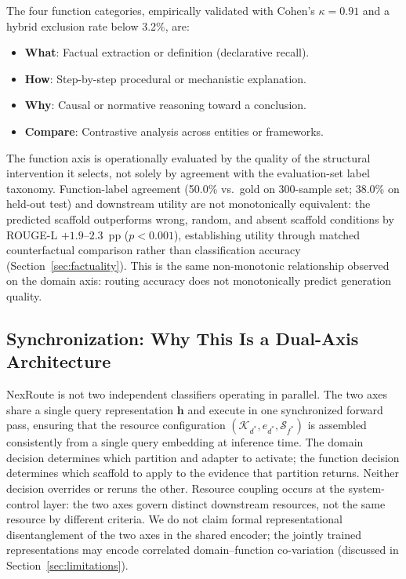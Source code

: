 \documentclass[a4paper,fleql,doubleblind]{cas-sc}
\begin{document}
The four function categories, empirically validated with Cohen's $\kappa = 0.91$ and a hybrid exclusion rate below 3.2\%, are:

\begin{itemize}
    \item \textbf{What}: Factual extraction or definition (declarative recall).
    \item \textbf{How}: Step-by-step procedural or mechanistic explanation.
    \item \textbf{Why}: Causal or normative reasoning toward a conclusion.
    \item \textbf{Compare}: Contrastive analysis across entities or frameworks.
\end{itemize}


The function axis is operationally evaluated by the quality of the structural
intervention it selects, not solely by agreement with the evaluation-set label taxonomy.
Function-label agreement (50.0\% vs.\ gold on 300-sample set; 38.0\% on held-out test)
and downstream utility are not monotonically equivalent: the predicted scaffold outperforms
wrong, random, and absent scaffold conditions by ROUGE-L $+1.9$--$2.3$~pp ($p{<}0.001$),
establishing utility through matched counterfactual comparison rather than classification
accuracy (Section~\ref{sec:factuality}).
This is the same non-monotonic relationship observed on the domain axis:
routing accuracy does not monotonically predict generation quality.

\subsection{Synchronization: Why This Is a Dual-Axis Architecture}
\label{ssec:sync}

NexRoute is not two independent classifiers operating in parallel.
The two axes share a single query representation $\mathbf{h}$ and execute in one
synchronized forward pass, ensuring that the resource configuration
$(\mathcal{K}_{d^*}, e_{d^*}, \mathcal{S}_{f^*})$ is assembled consistently from
a single query embedding at inference time.
The domain decision determines which partition and adapter to activate;
the function decision determines which scaffold to apply to the evidence that partition returns.
Neither decision overrides or reruns the other.
Resource coupling occurs at the system-control layer: the two axes govern
distinct downstream resources, not the same resource by different criteria.
We do not claim formal representational disentanglement of the two axes
in the shared encoder; the jointly trained representations may encode
correlated domain--function co-variation (discussed in Section~\ref{sec:limitations}).
\end{document}
